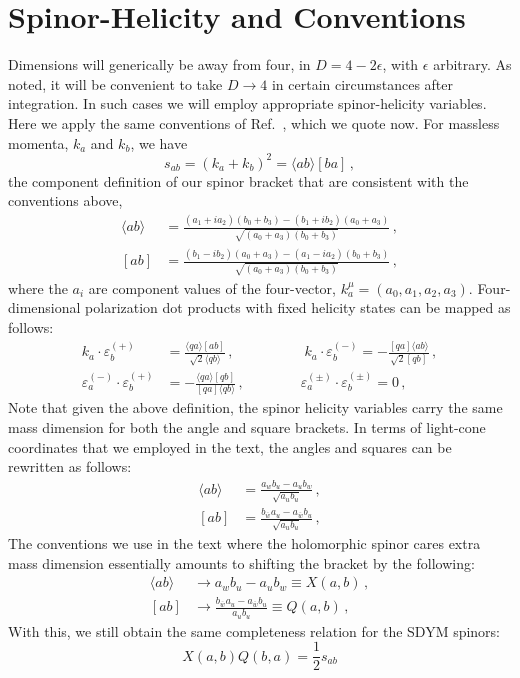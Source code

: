 \documentclass[11pt,letter]{article}
\def\be{\begin{equation}}
\def\ee{\end{equation}}
\begin{document}
\section{Spinor-Helicity and Conventions}
Dimensions will generically be away from four, in $D=4-2\epsilon$, with $\epsilon$ arbitrary. As noted, it will be convenient to take $D\rightarrow 4$ in certain circumstances after integration.  In such cases we will employ appropriate spinor-helicity variables.  Here we apply the same conventions of Ref.~\cite{jjmcTASI2014}, which we quote now. For massless momenta, $k_a$ and $k_b$, we have 
\begin{equation}
s_{ab} = (k_a+k_b)^2= \langle ab \rangle[ba]\,,
\end{equation}
the component definition of our spinor bracket that are consistent with the conventions above,
\begin{align}
\langle ab \rangle &= \frac{(a_1 + i a_2)(b_0+b_3)-(b_1 + i b_2)(a_0+a_3)}{\sqrt{(a_0+a_3)(b_0+b_3)}}\,,
\\
[ab] &= \frac{(b_1 - i b_2)(a_0+a_3)-(a_1 - i a_2)(b_0+b_3)}{\sqrt{(a_0+a_3)(b_0+b_3)}}\,,
\end{align}
where the $a_i$ are component values of the four-vector, $k^\mu_a = (a_0,a_1,a_2,a_3)$. Four-dimensional polarization dot products with fixed helicity states can be mapped as follows:
\begin{equation}\label{eqn:4DPols}
\begin{aligned}
k_a \cdot \varepsilon_b^{(+)} &= \frac{\langle q a \rangle[ab]}{\sqrt{2}\langle q b\rangle}\,,
\qquad\quad \qquad
k_a \cdot \varepsilon_b^{(-)} = -\frac{[qa]\langle ab\rangle}{\sqrt{2}[qb]}\,,
\\
\varepsilon_a^{(-)}\cdot \varepsilon_b^{(+)} &= - \frac{\langle q a\rangle [qb]}{ [qa]\langle q b\rangle} \,,
\qquad \qquad
\varepsilon_a^{(\pm)}\cdot \varepsilon_b^{(\pm)} = 0 \,,
\end{aligned}
\end{equation}
Note that given the above definition, the spinor helicity variables carry the same mass dimension for both the angle and square brackets. In terms of light-cone coordinates that we employed in the text, the angles and squares can be rewritten as follows:
\begin{align}
\langle ab \rangle &= \frac{a_w b_u-a_u b_w}{\sqrt{a_ub_u}}\,,
\\
[ab] &= \frac{b_{\bar{w}}a_u-a_{\bar{w}}b_u}{\sqrt{a_ub_u}}\,,
\end{align}
The conventions we use in the text where the holomorphic spinor cares extra mass dimension essentially amounts to shifting the bracket by the following:
\begin{align}
\langle ab \rangle &\rightarrow a_w b_u-a_u b_w \equiv X(a,b)\,,
\\
[ab] &\rightarrow \frac{b_{\bar{w}}a_u-a_{\bar{w}}b_u}{a_ub_u}\equiv Q(a,b)\,,
\end{align}
With this, we still obtain the same completeness relation for the SDYM spinors:
\be
X(a,b)Q(b,a) = \frac{1}{2}s_{ab}
\ee
\end{document}
